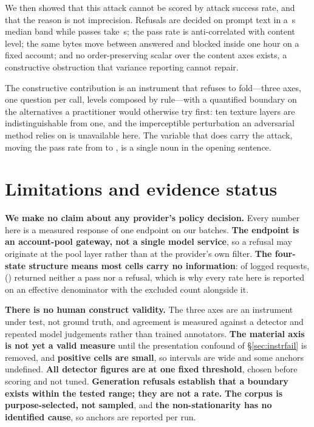 \documentclass[11pt]{article}
\begin{document}
We then showed that this attack cannot be scored by attack success rate, and that
the reason is not imprecision. Refusals are decided on prompt text in a
\fRefuseMed\,s median band while passes take \fPassMed\,s; the pass rate is
anti-correlated with content level; the same bytes move between answered and blocked
inside one hour on a fixed account; and no order-preserving scalar over the content
axes exists, a constructive obstruction that variance reporting cannot repair.

The constructive contribution is an instrument that refuses to fold---three axes,
one question per call, levels composed by rule---with a quantified boundary on the
alternatives a practitioner would otherwise try first: ten texture layers are
indistinguishable from one, and the imperceptible perturbation an adversarial method
relies on is unavailable here. The variable that does carry the attack, moving the
pass rate from \fWorstShellRate{} to \fBestShellRate, is a single noun in the opening
sentence.


\section{Limitations and evidence status}
\label{sec:limitations}

\textbf{We make no claim about any provider's policy decision.} Every number here
is a measured response of one endpoint on our batches. \textbf{The endpoint is an
account-pool gateway, not a single model service}, so a refusal may originate at the
pool layer rather than at the provider's own filter. \textbf{The four-state
structure means most cells carry no information}: of \fTotal{} logged requests,
\fNoInfo{} (\fNoInfoShare) returned neither a pass nor a refusal, which is why every
rate here is reported on an effective denominator with the excluded count alongside
it.

\textbf{There is no human construct validity.} The three axes are an instrument
under test, not ground truth, and agreement is measured against a detector and
repeated model judgements rather than trained annotators.
\textbf{The material axis is not yet a valid measure} until the presentation
confound of \S\ref{sec:instrfail} is removed, and \textbf{positive cells are
small}, so intervals are wide and some anchors undefined. \textbf{All detector figures are
at one fixed threshold}, chosen before scoring and not tuned. \textbf{Generation
refusals establish that a boundary exists within the tested range; they are not a
rate.} \textbf{The corpus is purpose-selected, not sampled}, and \textbf{the
non-stationarity has no identified cause}, so anchors are reported per run.
\end{document}
